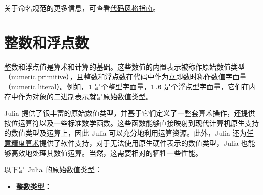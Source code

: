 关于命名规范的更多信息，可查看\hyperlink{12507952184948113283}{代码风格指南}。



\hypertarget{9431281250101057989}{}


\chapter{整数和浮点数}



整数和浮点值是算术和计算的基础。这些数值的内置表示被称作原始数值类型（numeric primitive），且整数和浮点数在代码中作为立即数时称作数值字面量（numeric literal）。例如，\texttt{1} 是个整型字面量，\texttt{1.0} 是个浮点型字面量，它们在内存中作为对象的二进制表示就是原始数值类型。



Julia 提供了很丰富的原始数值类型，并基于它们定义了一整套算术操作，还提供按位运算符以及一些标准数学函数。这些函数能够直接映射到现代计算机原生支持的数值类型及运算上，因此 Julia 可以充分地利用运算资源。此外，Julia 还为\hyperlink{7537478913062818871}{任意精度算术}提供了软件支持，对于无法使用原生硬件表示的数值类型，Julia 也能够高效地处理其数值运算。当然，这需要相对的牺牲一些性能。



以下是 Julia 的原始数值类型：



\begin{itemize}
\item \textbf{整数类型：}
\end{itemize}




